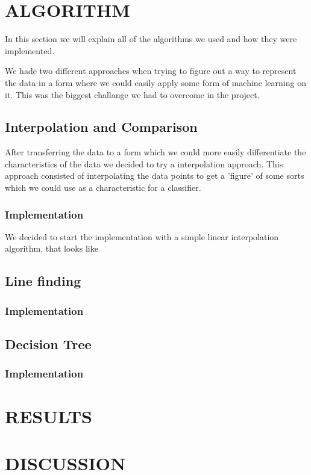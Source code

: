 \documentclass[a4paper, 10pt, conference]{ieeeconf}      %
\begin{document}
\section{ALGORITHM}
In this section we will explain all of the algorithms we used and how they were implemented. 

We hade two different approaches when trying to figure out a way to represent the data in a form where we could easily apply some form of machine learning on it. This was the biggest challange we had to overcome in the project. 
\subsection{Interpolation and Comparison}
After transferring the data to a form which we could more easily differentiate the characteristics of the data we decided to try a interpolation approach. This approach consisted of interpolating the data points to get a 'figure' of some sorts which we could use as a characteristic for a classifier.

\subsubsection{Implementation}
We decided to start the implementation with a simple linear interpolation algorithm, that looks like 

\subsection{Line finding}

\subsubsection{Implementation}

\subsection{Decision Tree}

\subsubsection{Implementation}

\section{RESULTS}

\section{DISCUSSION}
\end{document}
